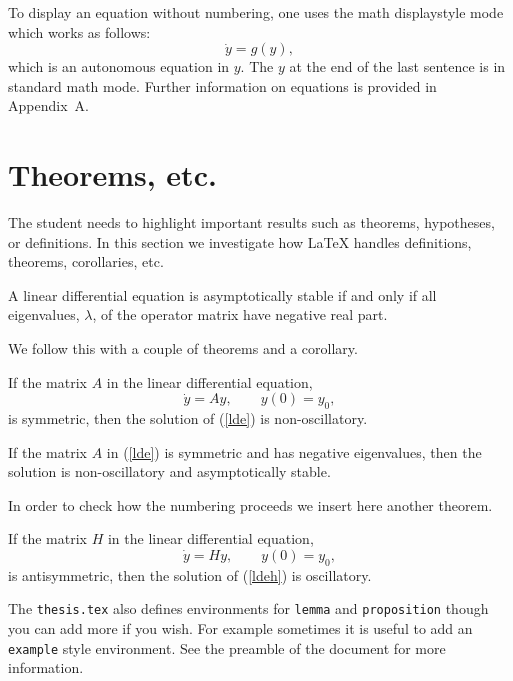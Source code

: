 To display an equation without numbering, one uses the math
displaystyle mode which works as follows:
\begin{equation*}
  \dot{y} = g(y),
\end{equation*}
which is an autonomous equation in $y$. The $y$ at the end of the last
sentence is in standard math mode. Further information on equations is
provided in Appendix~A.


\section{Theorems, etc.}

The student needs to highlight important results such as theorems,
hypotheses, or definitions. In this section we investigate how
\LaTeX{} handles definitions, theorems, corollaries, etc.
\begin{definition}   
  A linear differential equation is asymptotically stable if and only
  if all eigenvalues, $\lambda$, of the operator matrix have negative
  real part.
\end{definition}
We follow this with a couple of theorems and a corollary.
\begin{theorem}
  If the matrix $A$ in the linear differential equation,
  \begin{equation}
    \dot{y} = Ay, \qquad y(0) = y_0, \label{lde}
  \end{equation}
  is symmetric, then the solution of {\rm (\ref{lde})} is
  non-oscillatory.
\end{theorem}
\begin{corollary}
  If the matrix $A$ in {\rm (\ref{lde})} is symmetric and has negative
  eigenvalues, then the solution is non-oscillatory and asymptotically
  stable.
\end{corollary}

In order to check how the numbering proceeds we insert here another
theorem.
\begin{theorem}
  If the matrix $H$ in the linear differential equation,
  \begin{equation}
    \dot{y} = Hy, \qquad y(0) = y_0, \label{ldeh}
  \end{equation}
  is antisymmetric, then the solution of {\rm (\ref{ldeh})} is oscillatory.
\end{theorem}

The \texttt{thesis.tex} also defines environments for \texttt{lemma}
and \texttt{proposition} though you can add more if you wish.  For
example sometimes it is useful to add an \texttt{example} style
environment.  See the preamble of the document for more information.


